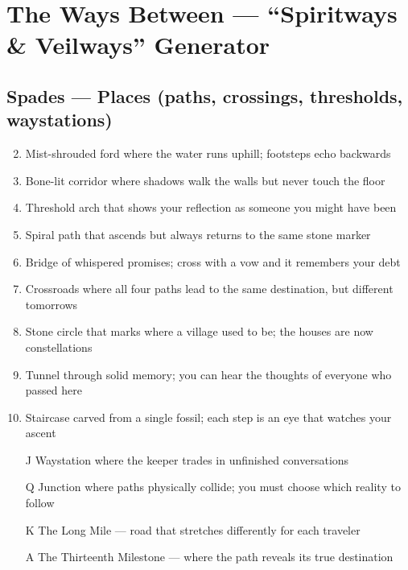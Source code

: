 \chapter{The Ways Between --- ``Spiritways \& Veilways'' Generator}

\section*{Spades --- Places (paths, crossings, thresholds, waystations)}
\begin{enumerate}
\setcounter{enumi}{1}
\item Mist-shrouded ford where the water runs uphill; footsteps echo backwards
\item Bone-lit corridor where shadows walk the walls but never touch the floor
\item Threshold arch that shows your reflection as someone you might have been
\item Spiral path that ascends but always returns to the same stone marker
\item Bridge of whispered promises; cross with a vow and it remembers your debt
\item Crossroads where all four paths lead to the same destination, but different tomorrows
\item Stone circle that marks where a village used to be; the houses are now constellations
\item Tunnel through solid memory; you can hear the thoughts of everyone who passed here
\item Staircase carved from a single fossil; each step is an eye that watches your ascent
\item[J] Waystation where the keeper trades in unfinished conversations
\item[Q] Junction where paths physically collide; you must choose which reality to follow
\item[K] The Long Mile --- road that stretches differently for each traveler
\item[A] The Thirteenth Milestone --- where the path reveals its true destination
\end{enumerate}

